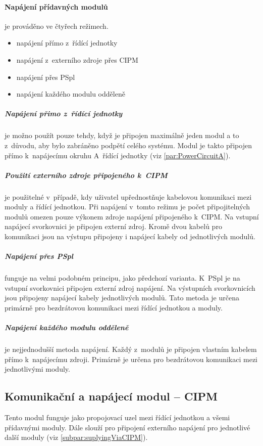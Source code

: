 \paragraph{Napájení přídavných modulů}
je prováděno ve čtyřech režimech.
\begin{itemize}
    \item napájení přímo z~řídící jednotky
    \item napájení z~externího zdroje přes CIPM
    \item napájení přes PSpl
    \item napájení každého modulu odděleně
\end{itemize}

\subparagraph{Napájení přimo z~řídící jednotky}
je možno použít pouze tehdy, když je připojen maximálně jeden modul a to z~důvodu, aby bylo zabráněno podpětí celého systému.
Modul je takto připojen přímo k~napájecímu okruhu A~řídící jednotky (viz \autoref{par:PowerCircuitA}).

\subparagraph{Použití externího zdroje připojeného k~CIPM}
\label{subpar:suplyingViaCIPM}
je použitelné v~případě, kdy uživatel upřednostňuje kabelovou komunikaci mezi moduly a řídící jednotkou.
Při napájení v~tomto režimu je počet připojitelných modulů omezen pouze výkonem zdroje napájení připojeného k~CIPM.
Na vstupní napájecí svorkovnici je připojen externí zdroj. 
Kromě dvou kabelů pro komunikaci jsou na výstupu připojeny i napájecí kabely od jednotlivých modulů.

\subparagraph{Napájení přes PSpl}
funguje na velmi podobném principu, jako předchozí varianta. 
K~PSpl je na vstupní svorkovnici připojen externí zdroj napájení.
Na výstupních svorkovnicích jsou připojeny napájecí kabely jednotlivých modulů.
Tato metoda je určena primárně pro bezdrátovou komunikaci mezi řídící jednotkou a moduly.

\subparagraph{Napájení každého modulu odděleně}
je nejjednodušší metoda napájení.
Každý z~modulů je připojen vlastním kabelem přímo k~napájecímu zdroji.
Primárně je určena pro bezdrátovou komunikaci mezi jednotlivými moduly. 

\subsection{Komunikační a napájecí modul -- CIPM}
\label{subsec:CIPM}
Tento modul funguje jako propojovací uzel mezi řídící jednotkou a všemi přídavnými moduly.
Dále slouží pro připojení externího napájení pro jednotlivé další moduly (viz \autoref{subpar:suplyingViaCIPM}).

